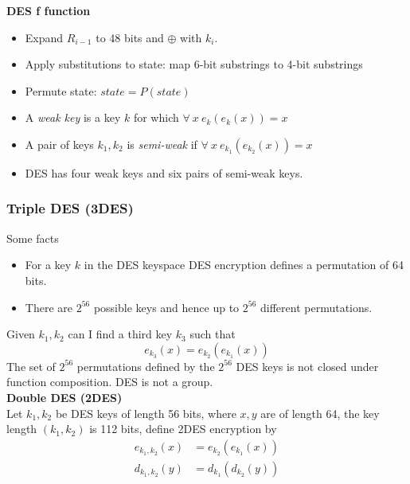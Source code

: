\textbf{DES f function}
\begin{center}
    \desf
\end{center}
\begin{itemize}
    \item Expand $R_{i−1}$ to 48 bits and $\oplus$ with $k_i$.
    \item Apply substitutions to state: map 6-bit substrings to 4-bit substrings
    \item Permute state: $state = P(state)$
\end{itemize}

\begin{itemize}
    \item A \textit{weak key} is a key $k$ for which $\forall\ x\ e_k(e_k(x)) = x$
    \item A pair of keys $k_1, k_2$ is \textit{semi-weak} if $\forall\ x\ e_{k_1} (e_{k_2}(x)) = x$
    \item DES has four weak keys and six pairs of semi-weak keys.
\end{itemize}

\subsubsection{Triple DES (3DES)}
Some facts
\begin{itemize}
    \item For a key $k$ in the DES keyspace DES encryption defines a permutation of 64 bits.
    \item There are $2^{56}$ possible keys and hence up to $2^{56}$ different permutations.
\end{itemize}
Given $k_1, k_2$ can I find a third key $k_3$ such that
$$e_{k_3}(x) = e_{k_2}(e_{k_1}(x))$$
The set of $2^{56}$ permutations defined by the $2^{56}$ DES keys is not closed under function composition.
DES is not a group.\\

\textbf{Double DES (2DES)}\\
Let $k_1, k_2$ be DES keys of length 56 bits,
where $x, y$ are of length 64, the key length $(k_1,k_2)$ is 112 bits,
define 2DES encryption by
\begin{align*}
    e_{k_1,k_2}(x) &= e_{k_2}(e_{k_1}(x)) \\
    d_{k_1,k_2}(y) &= d_{k_1}(d_{k_2}(y))
\end{align*}

